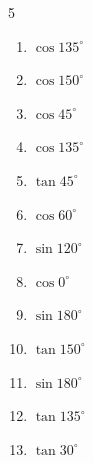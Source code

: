 \begin{multicols}{5}
\begin{enumerate}
  \item $\displaystyle \cos{135^\circ}$


  \item $\displaystyle \cos{150^\circ}$


  \item $\displaystyle \cos{45^\circ}$


  \item $\displaystyle \cos{135^\circ}$


  \item $\displaystyle \tan{45^\circ}$

        \phantom{$\displaystyle =1$}

  \item $\displaystyle \cos{60^\circ}$


  \item $\displaystyle \sin{120^\circ}$


  \item $\displaystyle \cos{0^\circ}$

        \phantom{$\displaystyle =1$}

\columnbreak %

  \item $\displaystyle \sin{180^\circ}$

        \phantom{$\displaystyle =0$}

  \item $\displaystyle \tan{150^\circ}$


  \item $\displaystyle \sin{180^\circ}$

        \phantom{$\displaystyle =0$}

  \item $\displaystyle \tan{135^\circ}$

        \phantom{$\displaystyle =-1$}

  \item $\displaystyle \tan{30^\circ}$


\end{enumerate}
\end{multicols}

